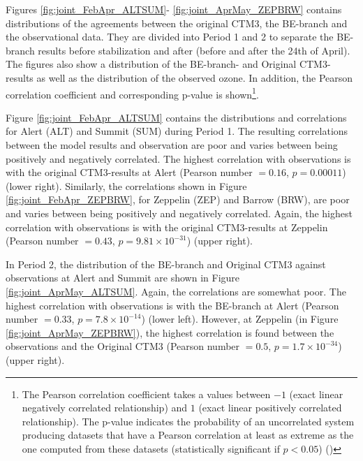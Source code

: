 Figures \ref{fig:joint_FebApr_ALTSUM}- \ref{fig:joint_AprMay_ZEPBRW} contains distributions of the agreements between the original CTM3, the BE-branch and the observational data. They are divided into Period 1 and 2 to separate the BE-branch results before stabilization and after (before and after the 24th of April). The figures also show a distribution of the BE-branch- and Original CTM3-results as well as the distribution of the observed ozone. In addition, the Pearson correlation coefficient and corresponding p-value is shown\footnote{The Pearson correlation coefficient takes a values between $-1$ (exact linear negatively correlated relationship) and $1$ (exact linear positively correlated relationship). The p-value indicates the probability of an uncorrelated system producing datasets that have a Pearson correlation at least as extreme as the one computed from these datasets (statistically significant if $p<0.05$) (\cite{WILKS201123})}.

\medskip

Figure \ref{fig:joint_FebApr_ALTSUM} contains the distributions and correlations for Alert (ALT) and Summit (SUM) during Period 1. The resulting correlations between the model results and observation are poor and varies between being positively and negatively correlated. The highest correlation with observations is with the original CTM3-results at Alert (Pearson number $=0.16$, $p = 0.00011$) (lower right). Similarly, the correlations shown in Figure \ref{fig:joint_FebApr_ZEPBRW}, for Zeppelin (ZEP) and Barrow (BRW), are poor and varies between being positively and negatively correlated. Again, the highest correlation with observations is with the original CTM3-results at Zeppelin (Pearson number $=0.43$, $p = 9.81\times10^{-31}$) (upper right). 

\medskip

In Period 2, the distribution of the BE-branch and Original CTM3 against observations at Alert and Summit are shown in Figure \ref{fig:joint_AprMay_ALTSUM}. Again, the correlations are somewhat poor. The highest correlation with observations is with the BE-branch at Alert (Pearson number $=0.33$, $p = 7.8\times10^{-14}$) (lower left). However, at Zeppelin (in Figure \ref{fig:joint_AprMay_ZEPBRW}), the highest correlation is found between the observations and the Original CTM3 (Pearson number $=0.5$, $p = 1.7\times10^{-34}$) (upper right). 






